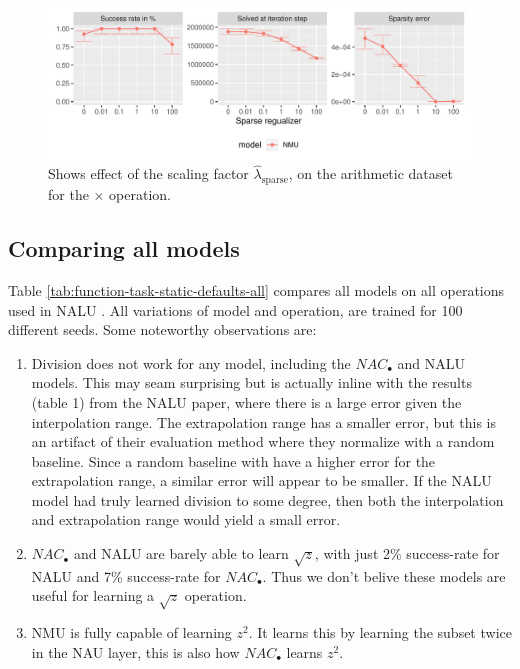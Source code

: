 \begin{figure}[H]
\centering
\includegraphics[width=\linewidth]{results/simple_function_static_regualization_mul.pdf}
\caption{Shows effect of the scaling factor $\hat{\lambda}_{\mathrm{sparse}}$, on the arithmetic dataset for the $\bm{\times}$ operation.}
\label{fig:simple-fnction-static-regularizer-mul}
\end{figure}

\subsection{Comparing all models}
\label{sec:appendix:comparison-all-models}

Table \ref{tab:function-task-static-defaults-all} compares all models on all operations used in NALU \cite{trask-nalu}. All variations of model and operation, are trained for 100 different seeds. Some noteworthy observations are:

\begin{enumerate}
    \item Division does not work for any model, including the $NAC_{\bullet}$ and NALU models. This may seam surprising but is actually inline with the results (table 1) from the NALU paper, where there is a large error given the interpolation range. The extrapolation range has a smaller error, but this is an artifact of their evaluation method where they normalize with a random baseline. Since a random baseline with have a higher error for the extrapolation range, a similar error will appear to be smaller. If the NALU model had truly learned division to some degree, then both the interpolation and extrapolation range would yield a small error.
    \item $NAC_{\bullet}$ and NALU are barely able to learn $\sqrt{z}$, with just 2\% success-rate for NALU and 7\% success-rate for $NAC_{\bullet}$. Thus we don't belive these models are useful for learning a $\sqrt{z}$ operation.
    \item NMU is fully capable of learning $z^2$. It learns this by learning the subset twice in the NAU layer, this is also how $NAC_{\bullet}$ learns $z^2$.
\end{enumerate}


